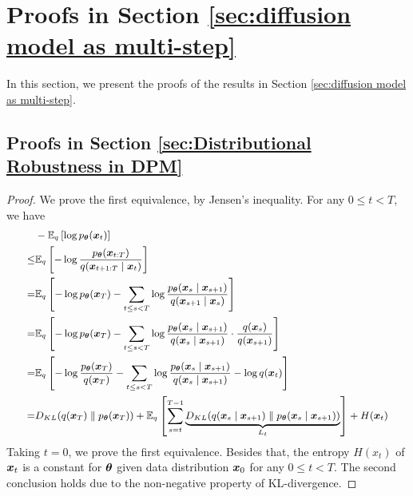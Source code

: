 \section{Proofs in Section \ref{sec:diffusion model as multi-step}}\label{app:proofs in sec:diffusion model as multi-step}
In this section, we present the proofs of the results in Section \ref{sec:diffusion model as multi-step}. 

\subsection{Proofs in Section \ref{sec:Distributional Robustness in DPM}}
\elboupperbound*
\begin{proof}
	We prove the first equivalence, by Jensen's inequality. For any $0 \leq t < T$, we have 
	\begin{equation}
    \small
		\begin{aligned} 
            & -\mathbb{E}_{q}\left[\log{p}_{\boldsymbol{\theta}}(\boldsymbol{x}_{t})\right]\\
            \leq &\mathbb{E}_{q}\left[-\log{\frac{p_{\boldsymbol{\theta}}(\boldsymbol{x}_{t:T})}{q(\boldsymbol{x}_{t+1:T}\mid \boldsymbol{x}_{t})}}\right] \\
            =& \mathbb{E}_{q}\left[-\log{p}_{\boldsymbol{\theta}}(\boldsymbol{x}_{T}) -\sum_{t \le s < T } \log{\frac{p_{\boldsymbol{\theta}}(\boldsymbol{x}_{s} \mid \boldsymbol{x}_{s+1})}{q(\boldsymbol{x}_{s+1} \mid \boldsymbol{x}_{s})}}\right] \\
            =& \mathbb{E}_{q}\left[-\log{p}_{\boldsymbol{\theta}}(\boldsymbol{x}_{T}) -\sum_{t \le s < T } \log{\frac{p_{\boldsymbol{\theta}}(\boldsymbol{x}_{s} \mid \boldsymbol{x}_{s+1})}{q(\boldsymbol{x}_{s} \mid \boldsymbol{x}_{s+1})} \cdot \frac{q(\boldsymbol{x}_{s})}{q(\boldsymbol{x}_{s+1})}  }\right] \\
            =&  \mathbb{E}_{q}\left[-\log \frac{p_{\boldsymbol{\theta}}(\boldsymbol{x}_{T})}{q(\boldsymbol{x}_{T}) } -\sum_{t \le s < T } \log{\frac{p_{\boldsymbol{\theta}}(\boldsymbol{x}_{s} \mid \boldsymbol{x}_{s+1})}{q(\boldsymbol{x}_{s} \mid \boldsymbol{x}_{s+1})} - \log q(\boldsymbol{x}_{t})  }\right] \\
            =&  D_{KL}(q(\boldsymbol{x}_{T})\parallel p_{\boldsymbol{\theta}}(\boldsymbol{x}_{T})) + \mathbb{E}_{q}\left[ \sum_{s = t}^{T-1}\underbrace{D_{KL}(q(\boldsymbol{x}_{s}\mid \boldsymbol{x}_{s+1}) \parallel p_{\boldsymbol{\theta}}(\boldsymbol{x}_{s}\mid \boldsymbol{x}_{s+1}))}_{L_{t}} \right] + H(\boldsymbol{x}_t)
		\end{aligned}
	\end{equation}
	Taking $t = 0$, we prove the first equivalence. Besides that, the entropy $H(x_{t})$ of $\boldsymbol{x}_t$ is a constant for $\boldsymbol{\theta}$ given data distribution $\boldsymbol{x}_0$ for any $0 \leq t < T$. The second conclusion holds due to the non-negative property of KL-divergence.  
\end{proof}
\par
\elboupperboundxt*
